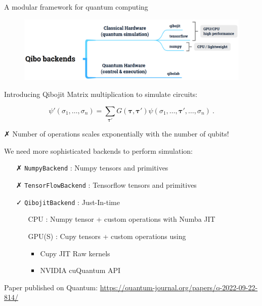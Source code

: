 \documentclass[11pt]{beamer}
\begin{document}
\begin{frame}{A modular framework for quantum computing}
    \begin{figure}
        \includegraphics[width= \textwidth]{figures/backends.png}
    \end{figure}
\end{frame}

\begin{frame}{Introducing Qibojit}
    Matrix multiplication to simulate circuits:

    \begin{equation*}\label{eq:gateapplication}
        \psi'(\sigma_1, \ldots, \sigma_n) = \sum _{\boldsymbol{\tau'}} G(\boldsymbol{\tau}, \boldsymbol{\tau'})\psi(\sigma_1,\ldots,\boldsymbol{\tau'},\ldots,\sigma_n) \ .
    \end{equation*}

    
    
    { \color{red} \faClose}  Number of operations scales { \color{red} exponentially} with the number of qubits!
   
    We need more sophisticated backends to perform simulation:
    \begin{itemize}
        \item[{ \color{red} \faClose}] \texttt{NumpyBackend} : { \color{blue} Numpy} tensors and primitives
        \item[{ \color{red} \faClose}] \texttt{TensorFlowBackend} : { \color{orange} Tensorflow} tensors and primitives
        \item[{ \color{green} \faCheck}] \texttt{QibojitBackend} : Just-In-time
        \item[]     \begin{itemize}
            \item[\faCode] CPU : { \color{blue} Numpy} tensor + custom operations with {\color{cyan} Numba JIT}
            \item[\faCode] GPU(S) : {\color{teal} Cupy} tensors + custom operations using
            \begin{itemize}
                \item  {\color{teal} Cupy JIT} Raw kernels
                \item  {\color{green} NVIDIA cuQuantum}  API
            \end{itemize} 
        \end{itemize}
    \end{itemize}

    Paper published on Quantum: \url{https://quantum-journal.org/papers/q-2022-09-22-814/}

    
\end{frame}
\end{document}
